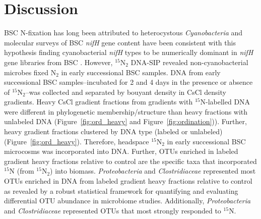 \section{Discussion}
BSC N-fixation has long been attributed to heterocystous
\textit{Cyanobacteria} and molecular surveys of BSC \textit{nifH} gene content
have been consistent with this hypothesis finding cyanobacterial \textit{nifH}
types to be numerically dominant in \textit{nifH} gene libraries from BSC
\citep{Yeager,14766579,Yeager_2012}. However, $^{15}$N$_{2}$ DNA-SIP revealed
non-cyanobacterial microbes fixed N$_{2}$ in early successional BSC samples.
DNA from early successional BSC samples--incubated for 2 and 4
days in the presence or absence of $^{15}$N$_{2}$--was collected
and separated by bouyant density in CsCl density gradients.
Heavy CsCl gradient fractions from gradients with $^{15}$N-labelled DNA were
different in phylogenetic membership/structure than heavy fractions with
unlabeled DNA (Figure~\ref{fig:ord_heavy} and Figure~\ref{fig:ordination})).
Further, heavy gradient fractions clustered by DNA type (labeled or unlabeled)
(Figure~\ref{fig:ord_heavy}). Therefore, headspace $^{15}$N$_{2}$ in
early successional BSC microcosms was incorporated into DNA. Further, OTUs
enriched in labeled gradient heavy fractions relative to control are the
specific taxa that incorporated $^{15}$N (from $^{15}$N$_{2}$) into biomass.
\textit{Proteobacteria} and \textit{Clostridiaceae} represented most OTUs
enriched in DNA from labeled gradient heavy fractions relative to control as
revealed by a robust statistical framework for quantifying and evaluating
differential OTU abundance in microbiome studies. Additionally,
\textit{Proteobacteria} and \textit{Clostridiaceae} represented OTUs that most
strongly responded to $^{15}$N.


